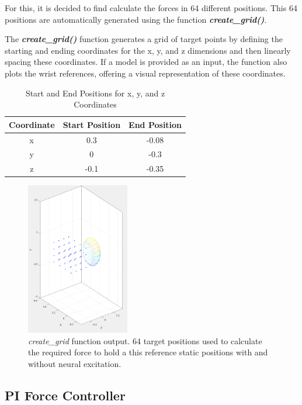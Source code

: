  For this, it is decided to find calculate the forces in 64 different positions. This 64 positions are automatically generated using the function \textit{\textbf{create\_grid()}}.


The \textbf{\textit{create\_grid()}} function generates a grid of target points by defining the starting and ending coordinates for the x, y, and z dimensions and then linearly spacing these coordinates. If a model is provided as an input, the function also plots the wrist references, offering a visual representation of these coordinates.

\begin{table}[h]
    \centering
    \caption{Start and End Positions for x, y, and z Coordinates}

    \begin{tabular}{|c|c|c|}
        \hline
        Coordinate & Start Position & End Position \\
        \hline
        x & 0.3 & -0.08 \\
        y & 0 & -0.3 \\
        z & -0.1 & -0.35 \\
        \hline
    \end{tabular}
    \label{table:coordinates}
\end{table}

\begin{figure}[h!]
    \centering
    \includegraphics[width=0.4\textwidth]{Pictures/Model/create_grid.png}
    \caption{\textit{create\_grid} function output. 64 target positions used to calculate the required force to hold a this reference static positions with and without neural excitation.}
    \label{fig:create_grid}
\end{figure}

\newpage
 \subsection{PI Force Controller}

